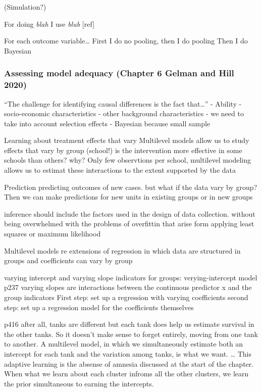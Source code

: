 \documentclass[a4, 12pt]{article}
\begin{document}
(Simulation?)

For doing \emph{blah} I use \emph{blub} {[}ref{]}

For each outcome variable\ldots{}
First I do no pooling, then I do pooling
Then I do Bayesian

\hypertarget{assessing-model-adequacy-chapter-6-gelman-and-hill-2020}{%
\subsubsection{Assessing model adequacy (Chapter 6 Gelman and Hill 2020)}\label{assessing-model-adequacy-chapter-6-gelman-and-hill-2020}}

``The challenge for identifying causal differences is the fact that\ldots{}''
- Ability
- socio-economic characteristics
- other background characteristics
- we need to take into account selection effects
- Bayesian because small sample

Learning about treatment effects that vary
Multilevel models allow us to study effects that vary by group (school!) is the intervention more effective in some schools than others? why? Only few observtions per school, multilevel modeling allows us to estimat these interactions to the extent supported by the data

Prediction
predicting outcomes of new cases. but what if the data vary by group? Then we can make predictions for new units in existing groups or in new groups

inference should include the factors used in the design of data collection. without being overwhelmed with the problems of overfittin that arise form applying least squares or maximum likelihood

Multilevel models re extensions of regression in which data are structured in groups and coefficients can vary by group

varying intercept and varying slope
indicators for groups: verying-intercept model p237
varying slopes are interactions between the continuous predictor x and the group indicators
First step: set up a regression with varying coefficients
second step: set up a regression model for the coefficients themselves

p416 after all, tanks are different but each tank does help us estimate survival in the other tanks. So it doesn't make sense to forget entirely, moving from one tank to another.
A multilevel model, in which we simultaneously estimate both an intercept for each tank and the variation among tanks, is what we want. \ldots{} This adaptive learning is the absense of amnesia discussed at the start of the chapter. When what we learn about each cluster infroms all the other clusters, we learn the prior simultaneous to earning the intercepts.
\end{document}
